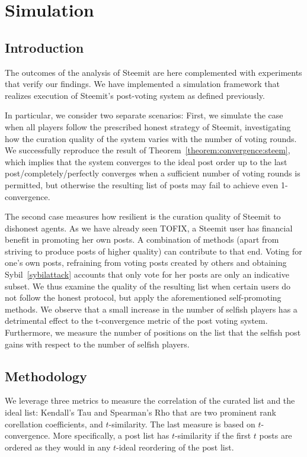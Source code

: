 \section{Simulation}
  \subsection{Introduction}
    The outcomes of the analysis of Steemit are here complemented with
    experiments that verify our findings. We have implemented a simulation
    framework that realizes execution of Steemit's post-voting system as defined
    previously.

    In particular, we consider two separate scenarios: First, we simulate the
    case when all players follow the prescribed honest strategy of Steemit,
    investigating how the curation quality of the system varies with the number
    of voting rounds. We successfully reproduce the result of
    Theorem~\ref{theorem:convergence:steem}, which implies that the system
    converges to the ideal post order up to the last post/completely/perfectly
    converges when a sufficient number of voting rounds is permitted, but
    otherwise the resulting list of posts may fail to achieve even
    1-convergence.

    The second case measures how resilient is the curation quality of Steemit to
    dishonest agents. As we have already seen TOFIX, a Steemit user has
    financial benefit in promoting her own posts. A combination of methods
    (apart from striving to produce posts of higher quality) can contribute to
    that end.  Voting for one's own posts, refraining from voting posts created
    by others and obtaining Sybil~\ref{sybilattack} accounts that only vote for
    her posts are only an indicative subset. We thus examine the quality of the
    resulting list when certain users do not follow the honest protocol, but
    apply the aforementioned self-promoting methods. We observe that a small
    increase in the number of selfish players has a detrimental effect to the
    t-convergence metric of the post voting system. Furthermore, we measure the
    number of positions on the list that the selfish post gains with respect to
    the number of selfish players.

  \subsection{Methodology}
    We leverage three metrics to measure the correlation of the curated list and
    the ideal list: Kendall's Tau and Spearman's Rho that are two prominent rank
    corellation coefficients, and $t$-similarity. The last measure is based on
    $t$-convergence. More specifically, a post list has $t$-similarity if the
    first $t$ posts are ordered as they would in any $t$-ideal reordering of the
    post list.

